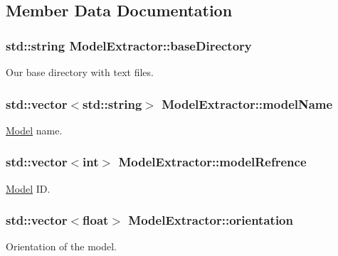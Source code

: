 \subsection{Member Data Documentation}
\subsubsection[{\texorpdfstring{base\+Directory}{baseDirectory}}]{\setlength{\rightskip}{0pt plus 5cm}std\+::string Model\+Extractor\+::base\+Directory\hspace{0.3cm}{\ttfamily [private]}}\hypertarget{class_model_extractor_a97d4cac0fe91a0bb91a736f780c8740a}{}\label{class_model_extractor_a97d4cac0fe91a0bb91a736f780c8740a}
Our base directory with text files. 
\subsubsection[{\texorpdfstring{model\+Name}{modelName}}]{\setlength{\rightskip}{0pt plus 5cm}std\+::vector$<$std\+::string$>$ Model\+Extractor\+::model\+Name\hspace{0.3cm}{\ttfamily [private]}}\hypertarget{class_model_extractor_a0167c9a9eab2cd5478f4399a55328db6}{}\label{class_model_extractor_a0167c9a9eab2cd5478f4399a55328db6}
\hyperlink{class_model}{Model} name. 
\subsubsection[{\texorpdfstring{model\+Refrence}{modelRefrence}}]{\setlength{\rightskip}{0pt plus 5cm}std\+::vector$<$int$>$ Model\+Extractor\+::model\+Refrence\hspace{0.3cm}{\ttfamily [private]}}\hypertarget{class_model_extractor_a507d1a9066e1a5eca6ccabad7a678432}{}\label{class_model_extractor_a507d1a9066e1a5eca6ccabad7a678432}
\hyperlink{class_model}{Model} ID. 
\subsubsection[{\texorpdfstring{orientation}{orientation}}]{\setlength{\rightskip}{0pt plus 5cm}std\+::vector$<$float$>$ Model\+Extractor\+::orientation\hspace{0.3cm}{\ttfamily [private]}}\hypertarget{class_model_extractor_ae0be066e55d4910fa79d7b3da45100d0}{}\label{class_model_extractor_ae0be066e55d4910fa79d7b3da45100d0}
Orientation of the model. 
